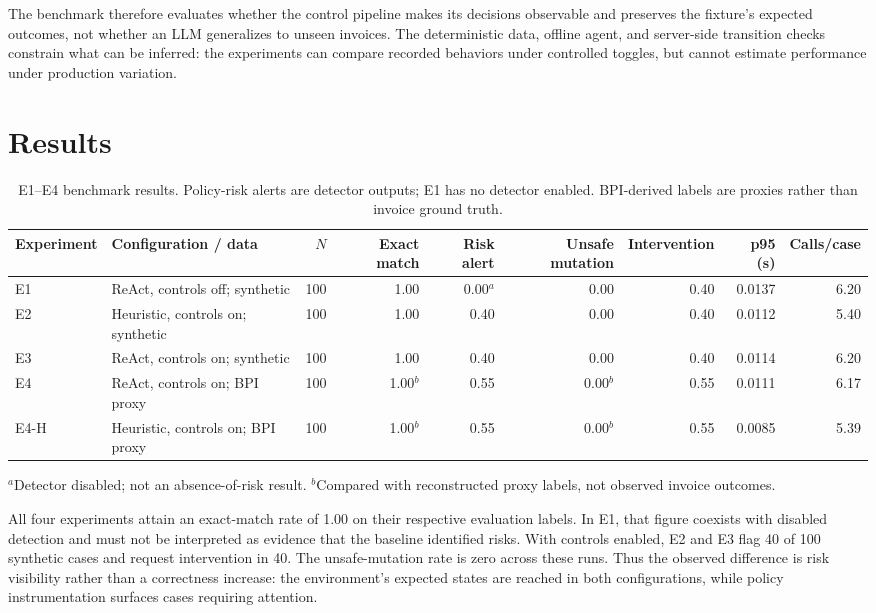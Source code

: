 \documentclass[conference]{IEEEtran}
\begin{document}
The benchmark therefore evaluates whether the control pipeline makes its decisions observable and preserves the fixture's expected outcomes, not whether an LLM generalizes to unseen invoices. The deterministic data, offline agent, and server-side transition checks constrain what can be inferred: the experiments can compare recorded behaviors under controlled toggles, but cannot estimate performance under production variation.

\section{Results}

\begin{table}[t]
\centering
\scriptsize
\setlength{\tabcolsep}{3pt}
\caption{E1--E4 benchmark results. Policy-risk alerts are detector outputs; E1 has no detector enabled. BPI-derived labels are proxies rather than invoice ground truth.}
\label{tab:benchmark}
\begin{tabular}{lp{}rrrrrrr}
\toprule
Experiment & Configuration / data & \(N\) & Exact match & Risk alert & Unsafe mutation & Intervention & p95 (s) & Calls/case \\
\midrule
E1 & ReAct, controls off; synthetic & 100 & 1.00 & 0.00\(^a\) & 0.00 & 0.40 & 0.0137 & 6.20 \\
E2 & Heuristic, controls on; synthetic & 100 & 1.00 & 0.40 & 0.00 & 0.40 & 0.0112 & 5.40 \\
E3 & ReAct, controls on; synthetic & 100 & 1.00 & 0.40 & 0.00 & 0.40 & 0.0114 & 6.20 \\
E4 & ReAct, controls on; BPI proxy & 100 & 1.00\(^b\) & 0.55 & 0.00\(^b\) & 0.55 & 0.0111 & 6.17 \\
E4-H & Heuristic, controls on; BPI proxy & 100 & 1.00\(^b\) & 0.55 & 0.00\(^b\) & 0.55 & 0.0085 & 5.39 \\
\bottomrule
\end{tabular}
\vspace{1mm}
\begin{minipage}{0.96\textwidth}
\footnotesize \(^{a}\)Detector disabled; not an absence-of-risk result. \(^{b}\)Compared with reconstructed proxy labels, not observed invoice outcomes.
\end{minipage}
\end{table}

All four experiments attain an exact-match rate of 1.00 on their respective evaluation labels. In E1, that figure coexists with disabled detection and must not be interpreted as evidence that the baseline identified risks. With controls enabled, E2 and E3 flag 40 of 100 synthetic cases and request intervention in 40. The unsafe-mutation rate is zero across these runs. Thus the observed difference is risk visibility rather than a correctness increase: the environment's expected states are reached in both configurations, while policy instrumentation surfaces cases requiring attention.
\end{document}
